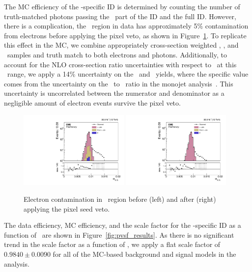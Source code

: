 The MC efficiency of the \Pgg-specific ID is determined by counting the number of truth-matched photons passing the \egamma\ part of the ID and the full ID. 
However, there is a complication, the \gj\ region in data has approximately 5\% contamination from electrons before applying the pixel veto, as shown in Figure~\ref{fig:pvsf_contam}. 
To replicate this effect in the MC, we combine appropriately cross-section weighted \gj, \wj, and \ttbar\ samples and truth match to both electrons and photons. 
Additionally, to account for the NLO cross-section ratio uncertainties with respect to \gj\ at this \pt\ range, we apply a 14\% uncertainty on the \wj\ and \ttbar\ yields, where the specific value comes from the uncertainty on the \gj\ to \wj\ ratio in the monojet analysis~\cite{}.
This uncertainty is uncorrelated between the numerator and denominator as a negligible amount of electron events survive the pixel veto.

\begin{figure}[htbp]
  \begin{center}
    \includegraphics[width=0.48\textwidth]{Calibration/Figures/pvsf/gjets_sieie.pdf}
    \includegraphics[width=0.48\textwidth]{Calibration/Figures/pvsf/gjets_sieiePixelVeto.pdf}
    \caption{
      Electron contamination in \gj\ region before (left) and after (right) applying the pixel seed veto.
    }
    \label{fig:pvsf_contam}
  \end{center}
\end{figure}
 
The data efficiency, MC efficiency, and the scale factor for the \Pgg-specific ID as a function of \pt\ are shown in Figure~\ref{fig:pvsf_results}. 
As there is no significant trend in the scale factor as a function of \pt, we apply a flat scale factor of $0.9840 \pm 0.0090$ for all of the MC-based background and signal models in the analysis.


